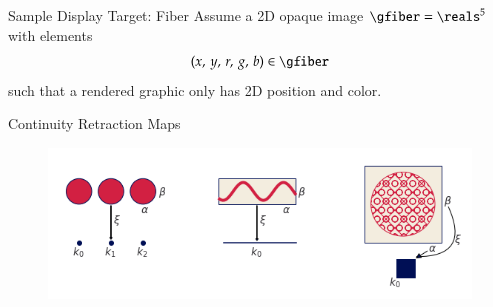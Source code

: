 \documentclass[xcolor={dvipsnames}, handout]{beamer}
\begin{document}
\begin{frame}{Sample Display Target: Fiber}
    Assume a 2D opaque image $\gfiber=\reals^5$ with elements 
    \begin{equation}
    (x,\, y,\, r,\, g,\, b) \in \gfiber
    \end{equation}
    such that a rendered graphic only has 2D position and color.
\end{frame}

\begin{frame}{Continuity Retraction Maps}   
    \begin{figure}[H]
        \includegraphics[width=1\textwidth]{figures/math/retraction_maps.png}
        \label{fig:graphic_retraction_map}
    \end{figure}
\end{frame}
\end{document}
